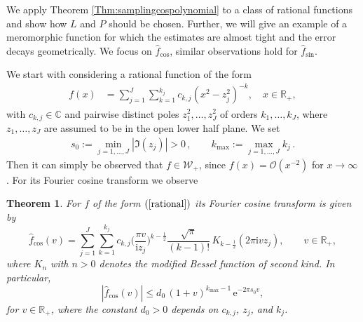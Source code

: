 \documentclass[11pt,a4paper]{scrartcl}
\newtheorem{theorem}{Theorem}[section]
\numberwithin{equation}{section}
\numberwithin{table}{section}
\numberwithin{figure}{section}
\newcommand{\e}{\mathrm e}
\renewcommand{\i}{\mathrm i}
\newcommand{\Rp}{{\mathbb R}_{+}}
\newcommand{\Wp}{{\mathcal W}_{+}}
\newcommand{\fcos}{{\hat f}_{\cos}}
\newcommand{\fsin}{{\hat f}_{\sin}}
\begin{document}
We apply Theorem \ref{Thm:samplingcospolynomial} to a class of rational functions and show how $L$
and $P$ should be chosen. Further, we will give an example of a meromorphic function for which the estimates
are almost tight and the error decays geometrically. We focus on $\fcos$, similar observations
hold for $\fsin$.

We start with considering a rational function of the form
\begin{align}\label{rational}
f(x) &= \textstyle  \sum\limits_{j=1}^J \sum\limits_{k=1}^{k_j} c_{k,j} (x^2-z_j^2)^{-k}, \quad x \in \Rp,
\end{align}
 with $c_{k,j} \in {\mathbb C}$ and pairwise distinct poles $z_1^2, \ldots, z_J^2$ of orders
$k_1, \ldots , k_J$,
where $z_1, \ldots , z_J$ are assumed to be in the open lower half plane.  We set
\begin{align}\label{s0}
	s_0 := \min\limits_{j=1,\ldots,J} |\Im ( z_j)| > 0\,, \qquad k_{\max} := \max\limits_{j=1,\ldots,J} k_j\,.
\end{align}
Then it can simply be observed that $f \in \Wp$, since $f(x) = {\mathcal O}(x^{-2})$ for $x \to \infty$.
For its Fourier cosine transform we observe

\begin{theorem}\label{neu}
For $f$ of the form $(\ref{rational})$ its Fourier cosine transform is given by
$$  \textstyle \fcos(v) = \sum\limits_{j=1}^J \sum\limits_{k=1}^{k_j} c_{k,j}
\Big(\frac{\pi v}{\i z_j} \Big)^{k - \frac{1}{2}} \frac{\sqrt{\pi}}{(k-1)!}   \,
K_{k- \frac{1}{2}}(2\pi \i v z_j)  ,
\qquad v \in \Rp,
$$
where $K_n$ with $n >0$ denotes the modified Bessel function of second kind.
In particular,
$$ \textstyle |\fcos(v)|  \le d_0\, (1+v)^{k_{\max}-1} \, \e^{- 2\pi s_0 v}, $$
for $v \in \Rp$, where the constant $d_0>0$ depends on $c_{k,j}$, $z_j$, and $k_j$.
\end{theorem}
\end{document}
